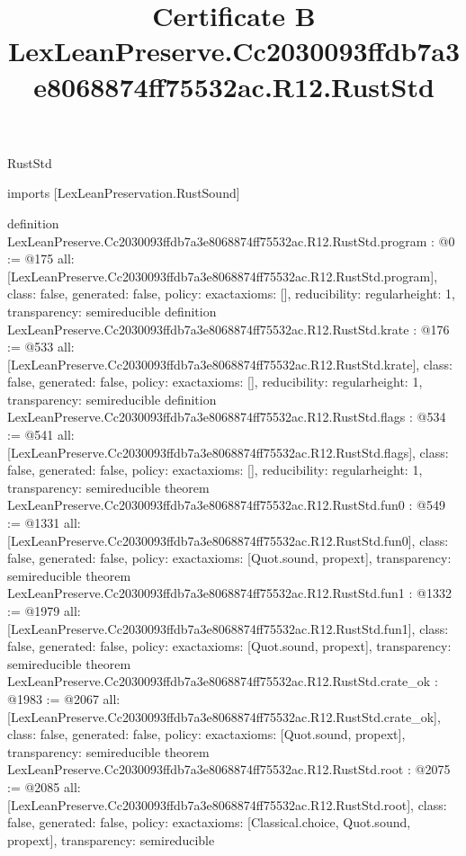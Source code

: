 \begin{lexlean}{RustStd}
\title{Certificate B LexLeanPreserve.Cc2030093ffdb7a3e8068874ff75532ac.R12.RustStd}
\begin{coremodule}
imports [LexLeanPreservation.RustSound]

definition LexLeanPreserve.Cc2030093ffdb7a3e8068874ff75532ac.R12.RustStd.program : @0 := @175 {
  all: [LexLeanPreserve.Cc2030093ffdb7a3e8068874ff75532ac.R12.RustStd.program],
  class: false,
  generated: false,
  policy: exact{axioms: []},
  reducibility: regular{height: 1},
  transparency: semireducible
}
definition LexLeanPreserve.Cc2030093ffdb7a3e8068874ff75532ac.R12.RustStd.krate : @176 := @533 {
  all: [LexLeanPreserve.Cc2030093ffdb7a3e8068874ff75532ac.R12.RustStd.krate],
  class: false,
  generated: false,
  policy: exact{axioms: []},
  reducibility: regular{height: 1},
  transparency: semireducible
}
definition LexLeanPreserve.Cc2030093ffdb7a3e8068874ff75532ac.R12.RustStd.flags : @534 := @541 {
  all: [LexLeanPreserve.Cc2030093ffdb7a3e8068874ff75532ac.R12.RustStd.flags],
  class: false,
  generated: false,
  policy: exact{axioms: []},
  reducibility: regular{height: 1},
  transparency: semireducible
}
theorem LexLeanPreserve.Cc2030093ffdb7a3e8068874ff75532ac.R12.RustStd.fun0 : @549 := @1331 {
  all: [LexLeanPreserve.Cc2030093ffdb7a3e8068874ff75532ac.R12.RustStd.fun0],
  class: false,
  generated: false,
  policy: exact{axioms: [Quot.sound, propext]},
  transparency: semireducible
}
theorem LexLeanPreserve.Cc2030093ffdb7a3e8068874ff75532ac.R12.RustStd.fun1 : @1332 := @1979 {
  all: [LexLeanPreserve.Cc2030093ffdb7a3e8068874ff75532ac.R12.RustStd.fun1],
  class: false,
  generated: false,
  policy: exact{axioms: [Quot.sound, propext]},
  transparency: semireducible
}
theorem LexLeanPreserve.Cc2030093ffdb7a3e8068874ff75532ac.R12.RustStd.crate_ok : @1983 := @2067 {
  all: [LexLeanPreserve.Cc2030093ffdb7a3e8068874ff75532ac.R12.RustStd.crate_ok],
  class: false,
  generated: false,
  policy: exact{axioms: [Quot.sound, propext]},
  transparency: semireducible
}
theorem LexLeanPreserve.Cc2030093ffdb7a3e8068874ff75532ac.R12.RustStd.root : @2075 := @2085 {
  all: [LexLeanPreserve.Cc2030093ffdb7a3e8068874ff75532ac.R12.RustStd.root],
  class: false,
  generated: false,
  policy: exact{axioms: [Classical.choice, Quot.sound, propext]},
  transparency: semireducible
}


\end{coremodule}
\end{lexlean}
